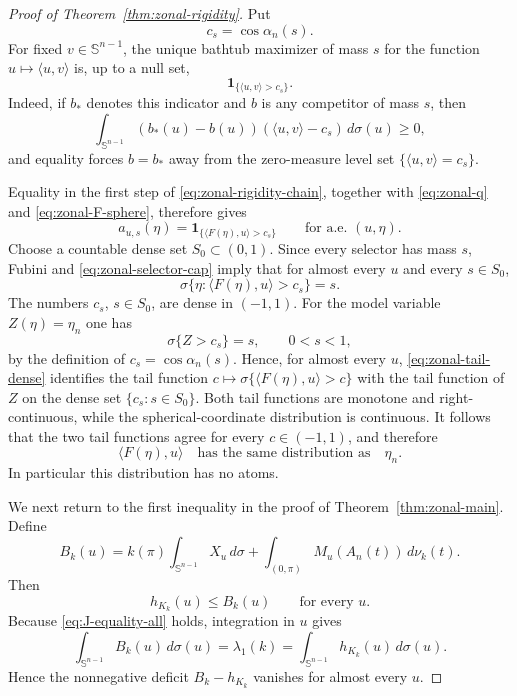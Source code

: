 \documentclass[10pt,a4paper]{amsart}
\begin{document}
\begin{proof}[Proof of Theorem~\ref{thm:zonal-rigidity}]
Put
\[
 c_s=\cos\alpha_n(s).
\]
For fixed $v\in\mathbb S^{n-1}$, the unique bathtub maximizer of mass $s$
for the function $u\mapsto\langle u,v\rangle$ is, up to a null set,
\[
 \mathbf1_{\{\langle u,v\rangle>c_s\}}.
\]
Indeed, if $b_*$ denotes this indicator and $b$ is any competitor of mass
$s$, then
\[
 \int_{\mathbb S^{n-1}}(b_*(u)-b(u))(\langle u,v\rangle-c_s)\,d\sigma(u)\ge0,
\]
and equality forces $b=b_*$ away from the zero-measure level set
$\{\langle u,v\rangle=c_s\}$.

Equality in the first step of \eqref{eq:zonal-rigidity-chain}, together
with \eqref{eq:zonal-q} and \eqref{eq:zonal-F-sphere}, therefore gives
\begin{equation}\label{eq:zonal-selector-cap}
 a_{u,s}(\eta)
 =
 \mathbf1_{\{\langle F(\eta),u\rangle>c_s\}}
 \qquad\text{for a.e. }(u,\eta).
\end{equation}
Choose a countable dense set $S_0\subset(0,1)$.  Since every selector has
mass $s$, Fubini and \eqref{eq:zonal-selector-cap} imply that for almost
every $u$ and every $s\in S_0$,
\begin{equation}\label{eq:zonal-tail-dense}
 \sigma\{
 \eta:\langle F(\eta),u\rangle>c_s
 \}
 =
 s.
\end{equation}
The numbers $c_s$, $s\in S_0$, are dense in $(-1,1)$.  For the model
variable $Z(\eta)=\eta_n$ one has
\[
 \sigma\{Z>c_s\}=s,
 \qquad 0<s<1,
\]
by the definition of $c_s=\cos\alpha_n(s)$.  Hence, for almost every $u$,
\eqref{eq:zonal-tail-dense} identifies the tail function
$c\mapsto\sigma\{\langle F(\eta),u\rangle>c\}$ with the tail function of
$Z$ on the dense set $\{c_s:s\in S_0\}$.  Both tail functions are monotone
and right-continuous, while the spherical-coordinate distribution is
continuous.  It follows that the two tail functions agree for every
$c\in(-1,1)$, and therefore
\begin{equation}\label{eq:zonal-projection-law}
 \langle F(\eta),u\rangle
 \quad\text{has the same distribution as}\quad
 \eta_n.
\end{equation}
In particular this distribution has no atoms.

We next return to the first inequality in the proof of
Theorem~\ref{thm:zonal-main}.  Define
\[
 B_k(u)
 =
 k(\pi)\int_{\mathbb S^{n-1}}X_u\,d\sigma
 +
 \int_{(0,\pi)}M_u(A_n(t))\,d\nu_k(t).
\]
Then
\[
 h_{K_k}(u)\le B_k(u)
 \qquad\text{for every }u.
\]
Because \eqref{eq:J-equality-all} holds, integration in $u$ gives
\[
 \int_{\mathbb S^{n-1}}B_k(u)\,d\sigma(u)
 =
 \lambda_1(k)
 =
 \int_{\mathbb S^{n-1}}h_{K_k}(u)\,d\sigma(u).
\]
Hence the nonnegative deficit $B_k-h_{K_k}$ vanishes for almost every
$u$.


\end{proof}
\end{document}
